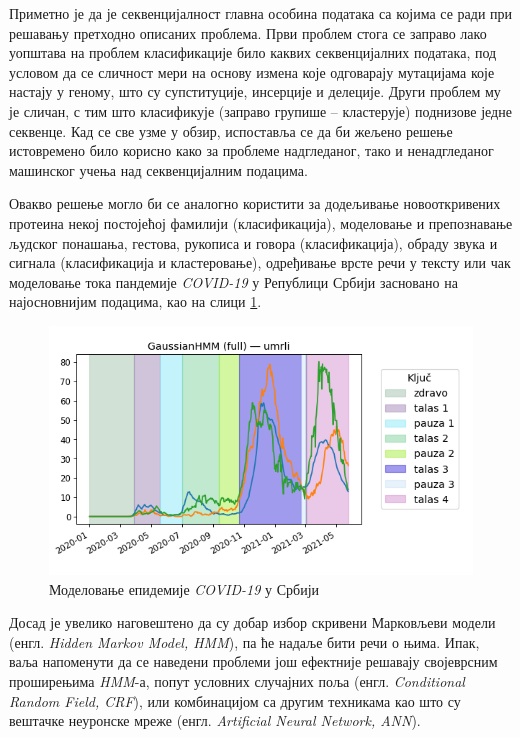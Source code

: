 \documentclass[12pt,oneside]{memoir}
\begin{document}
\begin{CJK}{UTF8}{ipxm}
Приметно је да је секвенцијалност главна особина података са којима се ради при решавању претходно описаних проблема. Први проблем стога се заправо лако уопштава на проблем класификације било каквих секвенцијалних података, под условом да се сличност мери на основу измена које одговарају мутацијама које настају у геному, што су супституције, инсерције и делеције. Други проблем му је сличан, с тим што класификује (заправо групише -- кластерује) поднизове једне секвенце. Кад се све узме у обзир, испоставља се да би жељено решење истовремено било корисно како за проблеме надгледаног, тако и ненадгледаног машинског учења над секвенцијалним подацима\cite{khoda2014}.

Овакво решење могло би се аналогно користити за додељивање новооткривених протеина некој постојећој фамилији\cite{nguyen2016} (класификација), моделовање и препознавање људског понашања, гестова, рукописа и говора\cite{gales2007} (класификација), обраду звука и сигнала\cite{andreao2006} (класификација и кластеровање), одређивање врсте речи у тексту\cite{mutjaba2020} или чак моделовање тока пандемије \textit{COVID-19} у Републици Србији засновано на најосновнијим подацима, као на слици \ref{fig:covid}.

\begin{figure}[!ht]
  \centering
  \includegraphics[width=.8\textwidth]{covid.png}
  \caption{Моделовање епидемије \textit{COVID-19} у Србији\cite{vasovic2021}}
  \label{fig:covid}
\end{figure}

Досад је увелико наговештено да су добар избор скривени Марковљеви модели (енгл. \textit{Hidden Markov Model, HMM}), па ће надаље бити речи о њима. Ипак, ваља напоменути да се наведени проблеми још ефектније решавају својеврсним проширењима \textit{HMM}-а, попут условних случајних поља\cite{ponomareva2007} (енгл. \textit{Conditional Random Field, CRF}), или комбинацијом са другим техникама као што су вештачке неуронске мреже\cite{cohen1999} (енгл. \textit{Artificial Neural Network, ANN}).


\end{CJK}
\end{document}

